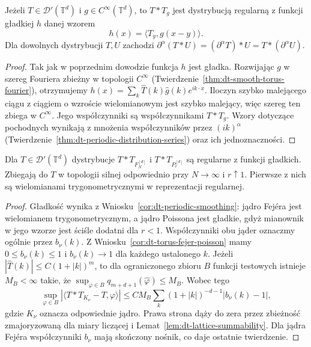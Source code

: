 \begin{wniosek}
\label{cor:dt-periodic-smoothing}
Jeżeli $T\in\mathcal D'(\mathbb T^d)$
i $g\in C^\infty(\mathbb T^d)$, to
$T*T_g$ jest dystrybucją regularną z funkcji
gładkiej $h$ danej wzorem
\[
 h(x)=\langle T_y,g(x-y)\rangle.
\]
Dla dowolnych dystrybucji $T,U$ zachodzi
$\partial^\alpha(T*U)=(\partial^\alpha T)*U
=T*(\partial^\alpha U)$.
\end{wniosek}
\begin{proof}
Tak jak w poprzednim dowodzie funkcja $h$
jest gładka. Rozwijając $g$ w szereg Fouriera
zbieżny w topologii $C^\infty$
(Twierdzenie~\ref{thm:dt-smooth-torus-fourier}),
otrzymujemy
$h(x)=\sum_k\widehat T(k)\widehat g(k)e^{ik\cdot x}$.
Iloczyn szybko malejącego ciągu z ciągiem
o wzroście wielomianowym jest szybko malejący,
więc szereg ten zbiega w $C^\infty$.
Jego współczynniki są współczynnikami $T*T_g$.
Wzory dotyczące pochodnych wynikają z mnożenia
współczynników przez $(ik)^\alpha$
(Twierdzenie~\ref{thm:dt-periodic-distribution-series})
oraz ich jednoznaczności.
\end{proof}

\begin{twierdzenie}
\label{thm:dt-periodic-distribution-regularization}
Dla $T\in\mathcal D'(\mathbb T^d)$ dystrybucje
$T*T_{F_N^{[d]}}$ i $T*T_{P_r^{[d]}}$
są regularne z funkcji gładkich.
Zbiegają do $T$ w topologii silnej
odpowiednio przy $N\to\infty$ i $r\uparrow1$.
Pierwsze z nich są wielomianami
trygonometrycznymi w reprezentacji regularnej.
\end{twierdzenie}
\begin{proof}
Gładkość wynika z Wniosku~\ref{cor:dt-periodic-smoothing}:
jądro Fejéra jest wielomianem trygonometrycznym,
a jądro Poissona jest gładkie, gdyż mianownik
w jego wzorze jest ściśle dodatni dla $r<1$.
Współczynniki obu jąder oznaczmy ogólnie przez
$b_\nu(k)$. Z Wniosku~\ref{cor:dt-torus-fejer-poisson}
mamy $0\le b_\nu(k)\le1$ i $b_\nu(k)\to1$
dla każdego ustalonego $k$.
Jeżeli $|\widehat T(k)|\le C(1+|k|)^m$,
to dla ograniczonego zbioru $B$ funkcji testowych
istnieje $M_B<\infty$ takie, że
$\sup_{\varphi\in B}q_{m+d+1}(\widehat\varphi)\le M_B$.
Wobec tego
\[
 \sup_{\varphi\in B}|\langle T*T_{K_\nu}-T,\varphi\rangle|
 \le CM_B\sum_k(1+|k|)^{-d-1}|b_\nu(k)-1|,
\]
gdzie $K_\nu$ oznacza odpowiednie jądro.
Prawa strona dąży do zera przez zbieżność
zmajoryzowaną dla miary liczącej i
Lemat~\ref{lem:dt-lattice-summability}.
Dla jądra Fejéra współczynniki $b_\nu$
mają skończony nośnik, co daje ostatnie twierdzenie.
\end{proof}

